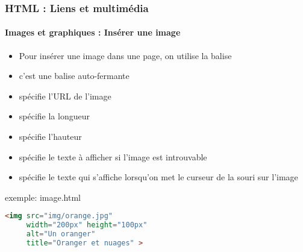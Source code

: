 \documentclass[xcolor=table]{beamer}
\begin{document}
\begin{frame}[fragile]
\frametitle{HTML : Liens et multimédia}
\framesubtitle{Images et graphiques : Insérer une image}

\begin{minipage}{0.50\textwidth} 
	\begin{itemize}
		\item Pour insérer une image dans une page, on utilise la balise 
		\item c'est une balise auto-fermante
		\item {} spécifie l'URL de l'image
		\item {} spécifie la longueur 
		\item {} spécifie l'hauteur
		\item {} spécifie le texte à afficher si l'image est introuvable 
		\item {} spécifie le texte qui s'affiche lorsqu'on met le curseur de la souri sur l'image
	\end{itemize}
\end{minipage}
%
\begin{minipage}{0.49\textwidth}
\begin{exampleblock}{exemple: image.html}
\lstset{escapeinside=**}
\scriptsize\bfseries\vspace{-6pt}
\begin{lstlisting}[language={html}]
<img src="img/orange.jpg"
     width="200px" height="100px"
     alt="Un oranger" 
     title="Oranger et nuages" >
\end{lstlisting}\vspace{-6pt}
\end{exampleblock}
\end{minipage}

\end{frame} 
\end{document}
